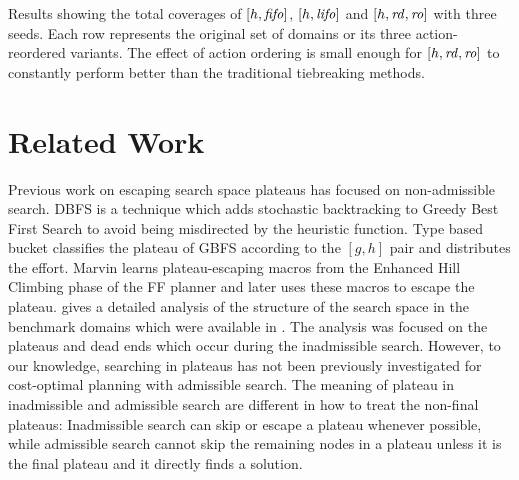 \begin{table}[tb]
 \setlength{\tabcolsep}{0.2em}
 \centering {}
 
 \caption{Results showing the total coverages of $[h,\mbox{\textit{fifo}}]$, $[h,\mbox{\textit{lifo}}]$
 and $[h,\mbox{\textit{rd}},\mbox{\textit{ro}}]$ with three seeds. Each row represents the original set of
 domains or its three action-reordered variants. The effect
 of action ordering is small enough for $[h,\mbox{\textit{rd}},\mbox{\textit{ro}}]$ to
 constantly perform better than the traditional tiebreaking methods.}
 \label{actionordering-robustness}
\end{table}

\section{Related Work}
\label{sec-4}

Previous work on escaping search space plateaus has focused on
non-admissible search.  DBFS \cite{imai2011novel} is a technique which
adds stochastic backtracking to Greedy Best First Search to avoid
being misdirected by the heuristic function. Type based bucket
\cite{xie14type} classifies the plateau of GBFS according to the
$[g,h]$ pair and distributes the effort.  Marvin \cite{Coles07} learns plateau-escaping macros
from the Enhanced Hill Climbing phase of the FF planner
\cite{Hoffmann01} and later uses these macros to escape the plateau.
\citeauthor{Hoffmann05} gives a detailed analysis of the
structure of the search space in the benchmark domains which were
available in \citeyear{Hoffmann05} \cite{Hoffmann05,Hoffmann14}. 
The analysis was focused on the plateaus and dead ends which occur during the inadmissible search.
% 
However, to our knowledge, searching in plateaus has not been
previously investigated for cost-optimal planning with admissible
search.
The meaning of plateau in inadmissible and admissible search are
different in how to treat the non-final plateaus: Inadmissible search can
skip or escape a plateau whenever possible, while
admissible search cannot skip the remaining nodes in a plateau unless it
is the final plateau and it directly finds a solution.

